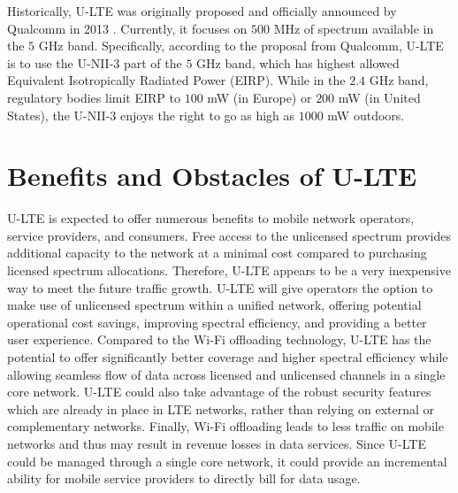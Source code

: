 Historically, \mbox{U-LTE} was originally proposed and officially announced by Qualcomm in 2013 \cite{Qualcomm-U-LTE-2013}. Currently, it focuses on $500$ MHz of spectrum available in the $5$ GHz band. Specifically, according to the proposal from Qualcomm, \mbox{U-LTE} is to use the U-NII-3 part of the $5$ GHz band, which has highest allowed Equivalent Isotropically Radiated Power (EIRP). While in the $2.4$ GHz band, regulatory bodies limit EIRP to $100$ mW (in Europe) or $200$ mW (in United States), the U-NII-3 enjoys the right to go as high as $1000$ mW outdoors.

\section{Benefits and Obstacles of U-LTE}
\label{lte-ben}
\mbox{U-LTE} is expected to offer numerous benefits to mobile network operators, service providers, and consumers. Free access to the unlicensed spectrum provides additional capacity to the network at a minimal cost compared to purchasing licensed spectrum allocations. Therefore, \mbox{U-LTE} appears to be a very inexpensive way to meet the future traffic growth. \mbox{U-LTE} will give operators the option to make use of unlicensed spectrum within a unified network, offering potential operational cost savings, improving spectral efficiency, and providing a better user experience. Compared to the \mbox{Wi-Fi} offloading technology, \mbox{U-LTE} has the potential to offer significantly better coverage and higher spectral efficiency while allowing seamless flow of data across licensed and unlicensed channels in a single core network. \mbox{U-LTE} could also take advantage of the robust security features which are already in place in LTE networks, rather than relying on external or complementary networks. Finally, \mbox{Wi-Fi} offloading leads to less traffic on mobile networks and thus may result in revenue losses in data services.  Since \mbox{U-LTE} could be managed through a single core network, it could provide an incremental ability for mobile service providers to directly bill for data usage.

